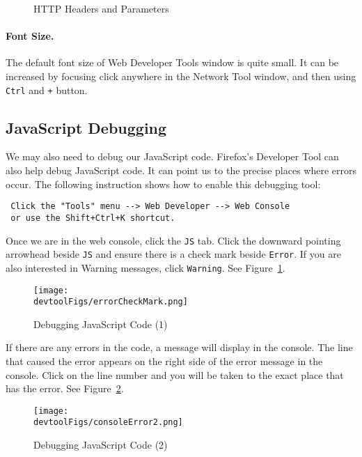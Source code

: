 \begin{figure}[htb]
 \centering
 \caption{HTTP Headers and Parameters}
\end{figure}


\paragraph{Font Size.} The default font size of Web Developer Tools window is quite small. It
can be increased by focusing click anywhere in the Network Tool window, and then using
\texttt{Ctrl} and \texttt{+} button.


\subsection{JavaScript Debugging}
\label{web:sec:jsdebugging}

We may also need to debug our JavaScript code. Firefox's Developer Tool can also help debug
JavaScript code. It can point us to the precise places where errors occur. The following
instruction shows how to enable this debugging tool:

\begin{lstlisting}
 Click the "Tools" menu --> Web Developer --> Web Console
 or use the Shift+Ctrl+K shortcut.
\end{lstlisting}


Once we are in the web console, click the {\tt JS} tab. Click the downward pointing arrowhead
beside {\tt JS} and ensure there is a check mark beside {\tt Error}. If you are also interested
in Warning messages, click {\tt Warning}. See Figure~\ref{devtool:fig:errocheckmark}.


\begin{figure}[htb]
\begin{center}
  \texttt{[image: \\devtoolFigs/errorCheckMark.png]}
\end{center}
\caption{Debugging JavaScript Code (1)}
\label{devtool:fig:errocheckmark}
\end{figure}
 

If there are any errors in the code, a message will display in the console. The line that
caused the error appears on the right side of the error message in the console. Click on the
line number and you will be taken to the exact place that has the error.
See Figure~\ref{devtool:fig:console}.


\begin{figure}[htb]
\begin{center}
  \texttt{[image: \\devtoolFigs/consoleError2.png]}
\end{center}
\caption{Debugging JavaScript Code (2)}
\label{devtool:fig:console}
\end{figure}
 




 
